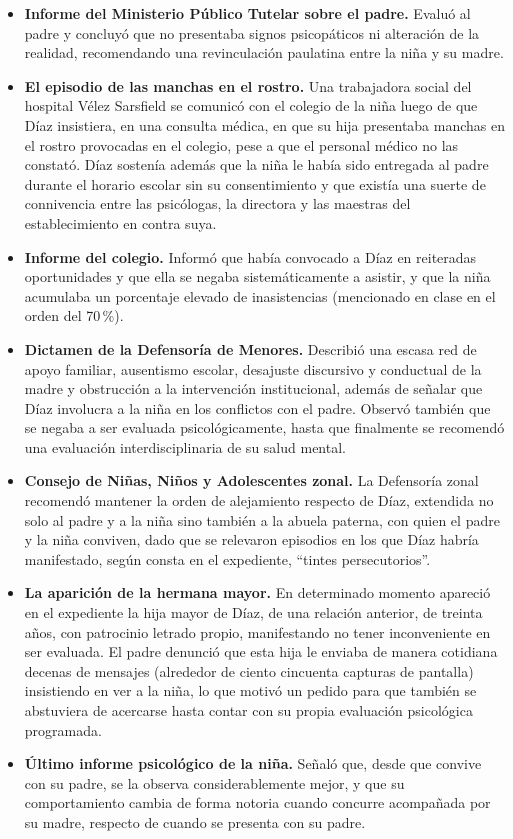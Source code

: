 \documentclass[12pt,oneside]{book}
\begin{document}
\begin{itemize}
    \item \textbf{Informe del Ministerio Público Tutelar sobre el padre.} Evaluó al padre y concluyó que no presentaba signos psicopáticos ni alteración de la realidad, recomendando una revinculación paulatina entre la niña y su madre.
    \item \textbf{El episodio de las manchas en el rostro.} Una trabajadora social del hospital Vélez Sarsfield se comunicó con el colegio de la niña luego de que Díaz insistiera, en una consulta médica, en que su hija presentaba manchas en el rostro provocadas en el colegio, pese a que el personal médico no las constató. Díaz sostenía además que la niña le había sido entregada al padre durante el horario escolar sin su consentimiento y que existía una suerte de connivencia entre las psicólogas, la directora y las maestras del establecimiento en contra suya.
    \item \textbf{Informe del colegio.} Informó que había convocado a Díaz en reiteradas oportunidades y que ella se negaba sistemáticamente a asistir, y que la niña acumulaba un porcentaje elevado de inasistencias (mencionado en clase en el orden del 70\,\%).
    \item \textbf{Dictamen de la Defensoría de Menores.} Describió una escasa red de apoyo familiar, ausentismo escolar, desajuste discursivo y conductual de la madre y obstrucción a la intervención institucional, además de señalar que Díaz involucra a la niña en los conflictos con el padre. Observó también que se negaba a ser evaluada psicológicamente, hasta que finalmente se recomendó una evaluación interdisciplinaria de su salud mental.
    \item \textbf{Consejo de Niñas, Niños y Adolescentes zonal.} La Defensoría zonal recomendó mantener la orden de alejamiento respecto de Díaz, extendida no solo al padre y a la niña sino también a la abuela paterna, con quien el padre y la niña conviven, dado que se relevaron episodios en los que Díaz habría manifestado, según consta en el expediente, ``tintes persecutorios''.
    \item \textbf{La aparición de la hermana mayor.} En determinado momento apareció en el expediente la hija mayor de Díaz, de una relación anterior, de treinta años, con patrocinio letrado propio, manifestando no tener inconveniente en ser evaluada. El padre denunció que esta hija le enviaba de manera cotidiana decenas de mensajes (alrededor de ciento cincuenta capturas de pantalla) insistiendo en ver a la niña, lo que motivó un pedido para que también se abstuviera de acercarse hasta contar con su propia evaluación psicológica programada.
    \item \textbf{Último informe psicológico de la niña.} Señaló que, desde que convive con su padre, se la observa considerablemente mejor, y que su comportamiento cambia de forma notoria cuando concurre acompañada por su madre, respecto de cuando se presenta con su padre.
\end{itemize}
\end{document}
